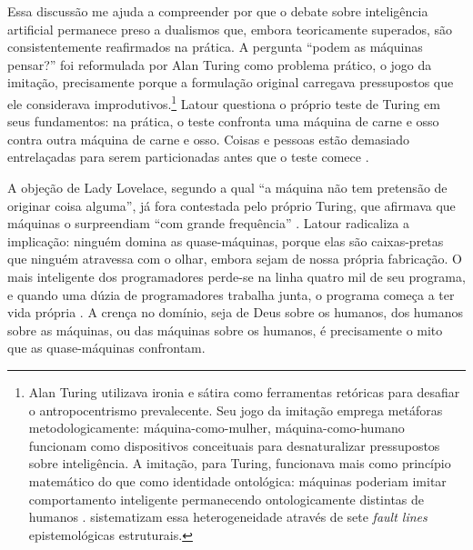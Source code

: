 Essa discussão me ajuda a compreender por que o debate sobre inteligência artificial permanece preso a dualismos que, embora teoricamente superados, são consistentemente reafirmados na prática. A pergunta \enquote{podem as máquinas pensar?} foi reformulada por Alan Turing como problema prático, o jogo da imitação, precisamente porque a formulação original carregava pressupostos que ele considerava improdutivos.\footnote{Alan Turing utilizava ironia e sátira como ferramentas retóricas para desafiar o antropocentrismo prevalecente. Seu jogo da imitação emprega metáforas metodologicamente: máquina-como-mulher, máquina-como-humano funcionam como dispositivos conceituais para desnaturalizar pressupostos sobre inteligência. A imitação, para Turing, funcionava mais como princípio matemático do que como identidade ontológica: máquinas poderiam imitar comportamento inteligente permanecendo ontologicamente distintas de humanos \parencite[p.~5]{Goncalves2024BeautifulThought}. \textcite{Quattrociocchi2025Epistemological} sistematizam essa heterogeneidade através de sete \textit{fault lines} epistemológicas estruturais.} Latour questiona o próprio teste de Turing em seus fundamentos: na prática, o teste confronta uma máquina de carne e osso contra outra máquina de carne e osso. Coisas e pessoas estão demasiado entrelaçadas para serem particionadas antes que o teste comece \parencite{Latour2008Powers}.

A objeção de Lady Lovelace, segundo a qual \enquote{a máquina não tem pretensão de originar coisa alguma}, já fora contestada pelo próprio Turing, que afirmava que máquinas o surpreendiam \enquote{com grande frequência} \parencite{Turing1950CMI}. Latour radicaliza a implicação: ninguém domina as quase-máquinas, porque elas são caixas-pretas que ninguém atravessa com o olhar, embora sejam de nossa própria fabricação. O mais inteligente dos programadores perde-se na linha quatro mil de seu programa, e quando uma dúzia de programadores trabalha junta, o programa começa a ter vida própria \parencite{Latour2008Powers}. A crença no domínio, seja de Deus sobre os humanos, dos humanos sobre as máquinas, ou das máquinas sobre os humanos, é precisamente o mito que as quase-máquinas confrontam.


